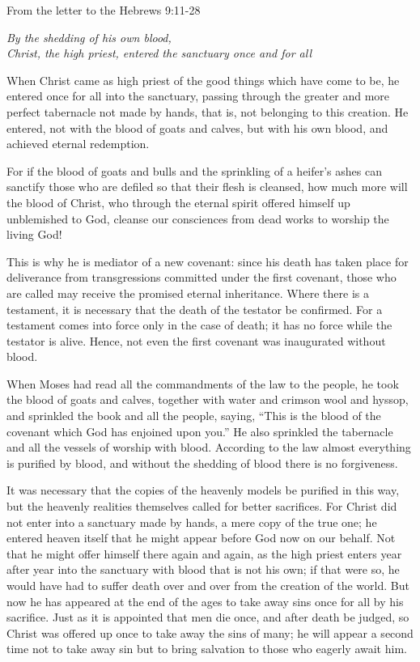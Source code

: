 \vspace{5pt}
\noindent From the letter to the Hebrews \hfill 9:11-28

\begin{center}\textit{By the shedding of his own blood, \\Christ, the high priest, entered the sanctuary once and for all}\end{center}

\lettrine[lines=3]{W}{}hen Christ came as high priest of the good things which have come to be, he entered once for all into the sanctuary, passing through the greater and more perfect tabernacle not made by hands, that is, not belonging to this creation. He entered, not with the blood of goats and calves, but with his own blood, and achieved eternal redemption.

For if the blood of goats and bulls and the sprinkling of a heifer’s ashes can sanctify those who are defiled so that their flesh is cleansed, how much more will the blood of Christ, who through the eternal spirit offered himself up unblemished to God, cleanse our consciences from dead works to worship the living God!

This is why he is mediator of a new covenant: since his death has taken place for deliverance from transgressions committed under the first covenant, those who are called may receive the promised eternal inheritance. Where there is a testament, it is necessary that the death of the testator be confirmed. For a testament comes into force only in the case of death; it has no force while the testator is alive. Hence, not even the first covenant was inaugurated without blood.

When Moses had read all the commandments of the law to the people, he took the blood of goats and calves, together with water and crimson wool and hyssop, and sprinkled the book and all the people, saying, “This is the blood of the covenant which God has enjoined upon you.” He also sprinkled the tabernacle and all the vessels of worship with blood. According to the law almost everything is purified by blood, and without the shedding of blood there is no forgiveness.

It was necessary that the copies of the heavenly models be purified in this way, but the heavenly realities themselves called for better sacrifices. For Christ did not enter into a sanctuary made by hands, a mere copy of the true one; he entered heaven itself that he might appear before God now on our behalf. Not that he might offer himself there again and again, as the high priest enters year after year into the sanctuary with blood that is not his own; if that were so, he would have had to suffer death over and over from the creation of the world. But now he has appeared at the end of the ages to take away sins once for all by his sacrifice. Just as it is appointed that men die once, and after death be judged, so Christ was offered up once to take away the sins of many; he will appear a second time not to take away sin but to bring salvation to those who eagerly await him.

